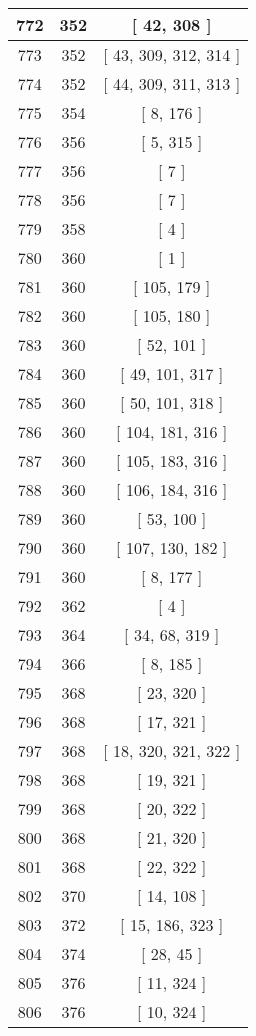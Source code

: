 \begin{center}
\begin{longtable}[H]{|| c c c ||}
\hline
772 & 352 & [ 42, 308 ] \\ 
\hline
773 & 352 & [ 43, 309, 312, 314 ] \\ 
\hline
774 & 352 & [ 44, 309, 311, 313 ] \\ 
\hline
775 & 354 & [ 8, 176 ] \\ 
\hline
776 & 356 & [ 5, 315 ] \\ 
\hline
777 & 356 & [ 7 ] \\ 
\hline
778 & 356 & [ 7 ] \\ 
\hline
779 & 358 & [ 4 ] \\ 
\hline
780 & 360 & [ 1 ] \\ 
\hline
781 & 360 & [ 105, 179 ] \\ 
\hline
782 & 360 & [ 105, 180 ] \\ 
\hline
783 & 360 & [ 52, 101 ] \\ 
\hline
784 & 360 & [ 49, 101, 317 ] \\ 
\hline
785 & 360 & [ 50, 101, 318 ] \\ 
\hline
786 & 360 & [ 104, 181, 316 ] \\ 
\hline
787 & 360 & [ 105, 183, 316 ] \\ 
\hline
788 & 360 & [ 106, 184, 316 ] \\ 
\hline
789 & 360 & [ 53, 100 ] \\ 
\hline
790 & 360 & [ 107, 130, 182 ] \\ 
\hline
791 & 360 & [ 8, 177 ] \\ 
\hline
792 & 362 & [ 4 ] \\ 
\hline
793 & 364 & [ 34, 68, 319 ] \\ 
\hline
794 & 366 & [ 8, 185 ] \\ 
\hline
795 & 368 & [ 23, 320 ] \\ 
\hline
796 & 368 & [ 17, 321 ] \\ 
\hline
797 & 368 & [ 18, 320, 321, 322 ] \\ 
\hline
798 & 368 & [ 19, 321 ] \\ 
\hline
799 & 368 & [ 20, 322 ] \\ 
\hline
800 & 368 & [ 21, 320 ] \\ 
\hline
801 & 368 & [ 22, 322 ] \\ 
\hline
802 & 370 & [ 14, 108 ] \\ 
\hline
803 & 372 & [ 15, 186, 323 ] \\ 
\hline
804 & 374 & [ 28, 45 ] \\ 
\hline
805 & 376 & [ 11, 324 ] \\ 
\hline
806 & 376 & [ 10, 324 ] \\ 

\end{longtable}
\end{center}
